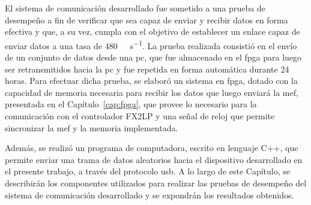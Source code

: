 

El sistema de comunicación desarrollado fue sometido a una prueba de desempeño a fin de verificar que sea capaz de enviar y recibir datos en forma efectiva y que, a su vez, cumpla con el objetivo de establecer un enlace capaz de enviar datos a una tasa de \SI{480}{\mega\bit\per\second}. La prueba realizada consistió en el envío de un conjunto de datos desde una \acrshort{pc}, que fue almacenado en el \acrshort{fpga} para luego ser retransmitidos hacia la \acrshort{pc} y fue repetida en forma automática durante 24 horas. Para efectuar dicha prueba, se elaboró un sistema en \acrshort{fpga}, dotado con la capacidad de memoria necesaria para recibir los datos que luego enviará la \acrshort{mef}, presentada en el Capítulo~\ref{cap:fpga}, que provee lo necesario para la comunicación con el controlador FX2LP y una señal de reloj que permite sincronizar la \acrshort{mef} y la memoria implementada.

Además, se realizó un programa de computadora, escrito en lenguaje C++, que permite enviar una trama de datos aleatorios hacia el dispositivo desarrollado en el presente trabajo, a través del protocolo \acrshort{usb}. A lo largo de este Capítulo, se describirán los componentes utilizados para realizar las pruebas de desempeño del sistema de comunicación desarrollado y se expondrán los resultados obtenidos.